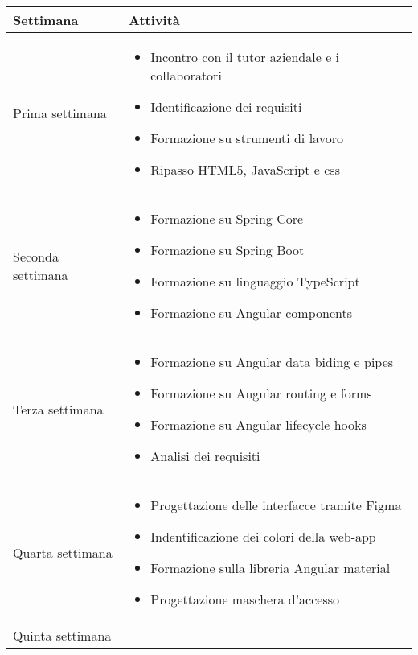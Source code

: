 \begin{center}
    \renewcommand{\arraystretch}{1.5}
    \begin{longtable}{ |p{3cm}|p{9cm}|  }
        \hline
        Settimana&Attività \\
        \hline
        \endhead
        Prima settimana&\begin{itemize}
            \item Incontro con il tutor aziendale e i collaboratori
            \item Identificazione dei requisiti
            \item Formazione su strumenti di lavoro
            \item Ripasso HTML5, JavaScript e css
        \end{itemize}\\
        Seconda settimana& \begin{itemize}
            \item Formazione su Spring Core
            \item Formazione su Spring Boot
            \item Formazione su linguaggio TypeScript
            \item Formazione su Angular components
        \end{itemize}\\ 
        Terza settimana&\begin{itemize}
            \item Formazione su Angular data biding e pipes
            \item Formazione su Angular routing e forms
            \item Formazione su Angular lifecycle hooks
            \item Analisi dei requisiti
        \end{itemize}\\
        Quarta settimana&\begin{itemize}
            \item Progettazione delle interfacce tramite Figma
            \item Indentificazione dei colori della web-app
            \item Formazione sulla libreria Angular material
            \item Progettazione maschera d'accesso
        \end{itemize}\\
        Quinta settimana&\begin{itemize}

\end{itemize}
\end{longtable}
\end{center}
